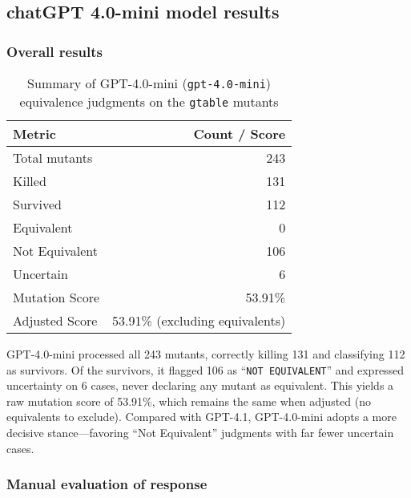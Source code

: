 \subsection{chatGPT 4.0-mini model results}

\subsubsection{Overall results}

\begin{table}[ht]
  \centering
  \begin{tabular}{lr}
    \hline\hline
    \textbf{Metric}        & \textbf{Count / Score}       \\
    \hline
    Total mutants          & 243                          \\
    Killed                 & 131                          \\
    Survived               & 112                          \\
    Equivalent             & 0                            \\
    Not Equivalent         & 106                          \\
    Uncertain              & 6                            \\
    Mutation Score         & 53.91\%                      \\
    Adjusted Score         & 53.91\% (excluding equivalents) \\
    \hline
  \end{tabular}
  \caption{Summary of GPT-4.0-mini (\texttt{gpt-4.0-mini}) equivalence judgments on the \texttt{gtable} mutants}
  \label{tab:gpt40mini-overall}
\end{table}

GPT-4.0-mini processed all 243 mutants, correctly killing 131 and classifying 112 as survivors.  Of the survivors, it flagged 106 as “\texttt{NOT EQUIVALENT}” and expressed uncertainty on 6 cases, never declaring any mutant as equivalent.  This yields a raw mutation score of 53.91\%, which remains the same when adjusted (no equivalents to exclude).  Compared with GPT-4.1, GPT-4.0-mini adopts a more decisive stance—favoring “Not Equivalent” judgments with far fewer uncertain cases. 

\subsubsection{Manual evaluation of response}

